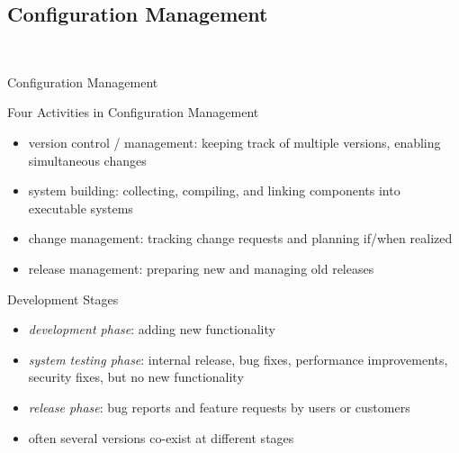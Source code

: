 \subsection{Configuration Management}
\begin{frame}{\insertsubsection\ \mytitlesource{\sommerville}}
	\begin{fancycolumns}
		\begin{definition}{Configuration Management}
		\end{definition}
		\begin{definition}{Four Activities in Configuration Management}
			\begin{itemize}
				\item version control / management: keeping track of multiple versions, enabling simultaneous changes
				\item system building: collecting, compiling, and linking components into executable systems
				\item change management: tracking change requests and planning if/when realized
				\item release management: preparing new and managing old releases
			\end{itemize}
		\end{definition}
		\nextcolumn
		\begin{definition}{Development Stages }
			\begin{itemize}
				\item \emph{development phase}: adding new functionality
				\item \emph{system testing phase}: internal release, bug fixes, performance improvements, security fixes, but no new functionality
				\item \emph{release phase}: bug reports and feature requests by users or customers
				\item often several versions co-exist at different stages
			\end{itemize}
		\end{definition}
	\end{fancycolumns}
\end{frame}

